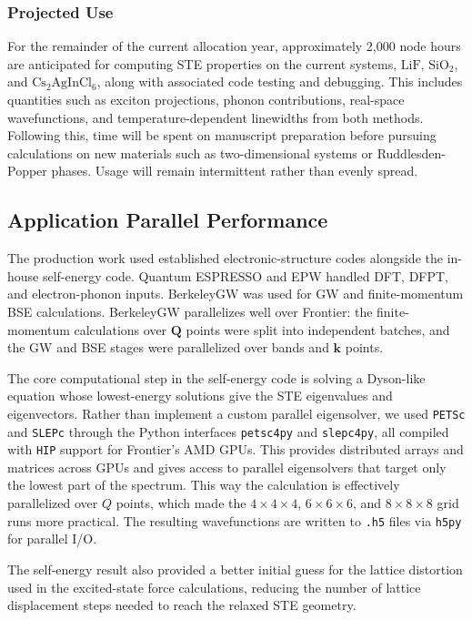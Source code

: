 \documentclass[11pt]{article}
\begin{document}
\subsubsection{Projected Use}

For the remainder of the current allocation year, approximately 2,000 node
hours are anticipated for computing STE properties on the current systems, 
\(\mathrm{LiF}\), \(\mathrm{SiO_2}\), and \(\mathrm{Cs_2AgInCl_6}\), along
with associated code testing and debugging. This includes quantities such as
exciton projections, phonon contributions, real-space wavefunctions, and
temperature-dependent linewidths from both methods.
Following this, time will be spent on
manuscript preparation before pursuing calculations on new materials such as
two-dimensional systems or Ruddlesden-Popper phases. Usage will remain
intermittent rather than evenly spread.

\subsection{Application Parallel Performance}
\label{sec:performance}

The production work used established electronic-structure codes alongside the
in-house self-energy code. Quantum ESPRESSO and EPW handled DFT, DFPT, and
electron-phonon inputs. BerkeleyGW was used for GW and finite-momentum BSE
calculations. BerkeleyGW parallelizes well over Frontier: the finite-momentum
calculations over $\mathbf{Q}$ points were split into independent batches, and
the GW and BSE stages were parallelized over bands and $\mathbf{k}$ points.

The core computational step in the self-energy code is solving a Dyson-like
equation whose lowest-energy solutions give the STE eigenvalues and
eigenvectors. Rather than implement a custom parallel eigensolver, we used
\texttt{PETSc} and \texttt{SLEPc} through the Python interfaces
\texttt{petsc4py} and \texttt{slepc4py}, all compiled with \texttt{HIP} support
for Frontier's AMD GPUs. This provides distributed arrays and matrices across
GPUs and gives access to parallel eigensolvers that target only the lowest part
of the spectrum. This way the calculation is effectively parallelized over $Q$ points,
which made the \(4 \times 4 \times 4\), \(6 \times 6 \times 6\), and
\(8 \times 8 \times 8\) grid runs more practical. The resulting wavefunctions are
written to \texttt{.h5} files via \texttt{h5py} for parallel I/O.

The self-energy result also provided a better initial guess for the lattice
distortion used in the excited-state force calculations, reducing the number
of lattice displacement steps needed to reach the relaxed STE geometry.
\end{document}
